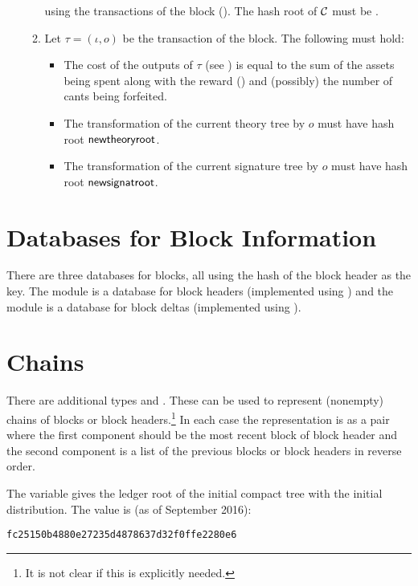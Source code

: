 \begin{itemize}
\begin{enumerate}
using the transactions of the block ({}).
The hash root of $\mathcal{C}$ must be {}.
\item Let $\tau=(\iota,o)$ be the transaction of the block. The following must hold:
\begin{itemize}
\item The cost of the outputs of $\tau$ (see {})
is equal to the sum of the assets being spent
along with the reward ({})
and (possibly) the number of cants being forfeited.
\item The transformation of the current theory tree by $o$ must have hash root $\field{newtheoryroot}$.
\item The transformation of the current signature tree by $o$ must have hash root $\field{newsignatroot}$.
\end{itemize}
\end{enumerate}
\end{itemize}

\section{Databases for Block Information}

There are three databases for blocks, all using the hash of the block header as the key.
The module {} is a database for block headers (implemented using {})
and
the module {} is a database for block deltas (implemented using {}).

\section{Chains}

There are additional types
{}
and 
{}.
These can be used to represent (nonempty) chains of blocks or block headers.\footnote{It is not clear if this is explicitly needed.}
In each case the representation is as a pair
where the first component should be the most recent block of block header
and the second component is a list of the previous blocks or block headers
in reverse order.

The variable {} gives the ledger root of the initial compact tree
with the initial distribution. The value is (as of September 2016):
\begin{verbatim}
fc25150b4880e27235d4878637d32f0ffe2280e6
\end{verbatim}


